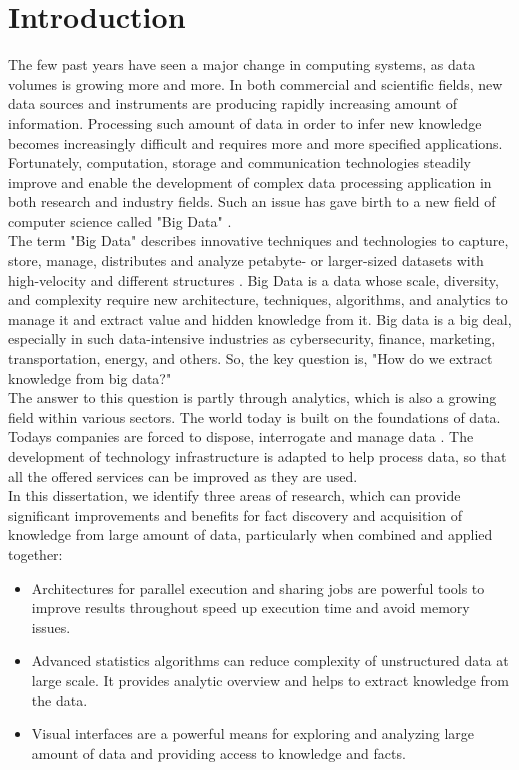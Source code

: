 \chapter*{Introduction} 


The few past years have seen a major change in computing systems, as data volumes is growing more and more. In both commercial and scientific fields, new data sources and instruments are producing rapidly increasing amount of information. Processing such amount of data in order to infer new knowledge becomes increasingly difficult and requires more and more specified applications. Fortunately, computation, storage and communication technologies steadily improve and enable the development of complex data processing application in both research and industry fields. Such an issue has gave birth to a new field of computer science called "Big Data" \cite{cite1}.\\

The term "Big Data" describes innovative techniques and technologies to capture, store, manage, distributes and analyze petabyte- or larger-sized datasets with high-velocity and different structures \cite{cite2}. Big Data is a data whose scale, diversity, and complexity require new architecture, techniques, algorithms, and analytics to manage it and extract value and hidden knowledge from it. Big data is a big deal, especially in such data-intensive industries as cybersecurity, finance, marketing, transportation, energy, and others. So, the key question is, "How do we extract knowledge from big data?"\\

The answer to this question is partly through analytics, which is also a growing field within various sectors. The world today is built on the foundations of data. Todays companies are forced to dispose, interrogate and manage data \cite{cite7}. The development of technology infrastructure is adapted to help process data, so that all the offered services can be improved as they are used.\\

In this dissertation, we identify three areas of research, which can provide significant improvements and benefits for fact discovery and acquisition of knowledge from large amount of data, particularly when combined and applied together:
\begin{itemize}
\item Architectures for parallel execution and sharing jobs are powerful tools to improve results throughout speed up execution time and avoid memory issues.
\item Advanced statistics algorithms can reduce complexity of unstructured data at large scale. It provides analytic overview and helps to extract knowledge from the data. 
\item Visual interfaces are a powerful means for exploring and analyzing large amount of data and providing access to knowledge and facts.\\ 
\end{itemize}

